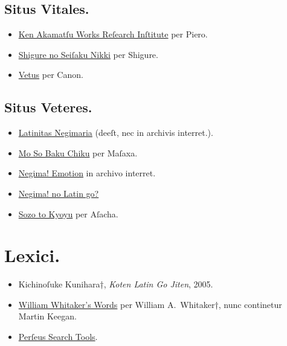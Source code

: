 \documentclass[12pt]{book}
\newcommand{\bookname}[1]{\textenglish{\emph{#1}}}
\begin{document}
\subsection*{Situs Vitales.}\label{active-websites}

\begin{itemize}
  \item \href{http://www2u.biglobe.ne.jp/~clown/}{Ken Akamatſu Works Reſearch Inſtitute} per Piero. %
  \item \href{http://tuwabuki20.blog5.fc2.com/}{Shigure no Seiſaku Nikki} per Shigure. %
  \item \href{https://vetus.wordpress.com/}{Vetus} per Canon.
\end{itemize}

\subsection*{Situs Veteres.}\label{oldies}

\begin{itemize}
  \item \href{http://www.genvid.com/diesgaudii/latin/ln/index.html}{Latinitas Negimaria} (deeſt, nec in archivis interret.).
  \item \href{https://blog.goo.ne.jp/masaxa}{Mo So Baku Chiku} per Maſaxa. %
  \item \href{https://web.archive.org/web/20150419192906/http://www7b.biglobe.ne.jp/~meril/index.html}{Negima! Emotion} in archivo interret. %
  \item \href{https://blog.goo.ne.jp/lowtech224}{Negima! no Latin go?} %
  \item \href{https://asacha.hatenadiary.org/}{Sozo to Kyoyu} per Aſacha. %
\end{itemize}

\section*{Lexici.}\label{lexicons}

\begin{itemize}
  \item Kichinoſuke Kunihara†, \bookname{Koten Latin Go Jiten}, 2005. %
  \item \href{https://github.com/mk270/whitakers-words}{William Whitaker's Words} per William A.~Whitaker†, nunc continetur Martin Keegan.
  \item \href{http://www.perseus.tufts.edu/hopper/search}{Perſeus Search Tools}.
\end{itemize}
\end{document}
